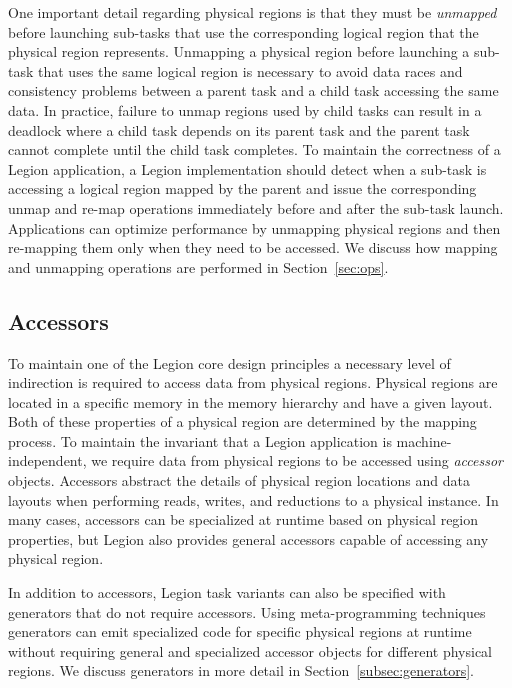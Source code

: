 One important detail regarding physical regions is
that they must be {\em unmapped} before launching
sub-tasks that use the corresponding logical region
that the physical region represents. Unmapping a 
physical region before launching a sub-task that uses
the same logical region is necessary to avoid data 
races and consistency problems between a parent task 
and a child task accessing the same data. In practice, 
failure to unmap regions used by child tasks can result 
in a deadlock where a child task depends on its parent
task and the parent task cannot complete until the
child task completes. To maintain the
correctness of a Legion application, a Legion
implementation should detect when a sub-task is
accessing a logical region mapped by the parent
and issue the corresponding unmap and re-map
operations immediately before and after the 
sub-task launch. Applications can optimize
performance by unmapping physical regions and
then re-mapping them only when they need to
be accessed. We discuss how mapping and unmapping
operations are performed in Section~\ref{sec:ops}. 

\subsection{Accessors}
\label{subsec:accessors}
To maintain one of the Legion core design principles
a necessary level of indirection is required to
access data from physical regions. Physical regions
are located in a specific memory in the memory 
hierarchy and have a given layout.  Both of these
properties of a physical region are determined by
the mapping process. To maintain the invariant that
a Legion application is machine-independent,
we require data from physical regions
to be accessed using {\em accessor} objects. Accessors
abstract the details of physical region locations
and data layouts when performing reads, writes, and
reductions to a physical instance. In many cases,
accessors can be specialized at runtime based on
physical region properties, but Legion also provides
general accessors capable of accessing any physical
region.

In addition to accessors, Legion task variants
can also be specified with generators that do not
require accessors. Using meta-programming techniques
generators can emit specialized code for specific
physical regions at runtime without requiring 
general and specialized accessor objects for different
physical regions. We discuss generators in more 
detail in Section~\ref{subsec:generators}.


